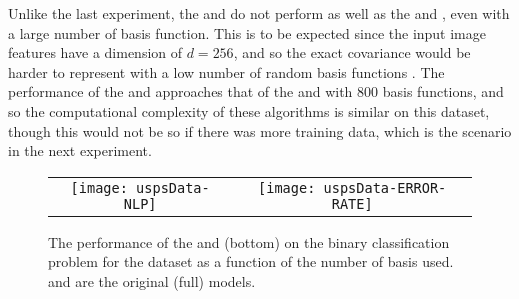 Unlike the last experiment, the \eks and \uks do not perform as well as the
\egp and \ugp, even with a large number of basis function. This is to be
expected since the input image features have a dimension of $d = 256$, and so
the exact covariance would be harder to represent with a low number of random
basis functions . The performance of the
\eks and \uks approaches that of the \ugp and \egp with 800 basis functions,
and so the computational complexity of these algorithms is similar on this
dataset, though this would not be so if there was more training data, which is
the scenario in the next experiment.

\begin{figure*}[h]
\centering
\begin{tabular}{c c}
\texttt{[image: uspsData-NLP]}  &
\texttt{[image: uspsData-ERROR-RATE]}  
\end{tabular}
\caption{The performance of the \eks and \uks (bottom) on the binary classification problem for the \usps dataset as a function of 
the number of  basis used. \egp and \ugp are the original (full) \gp models.
\label{fig:usps}
}
\end{figure*}
%
 


%

